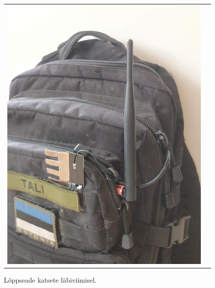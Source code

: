 \documentclass[12pt]{article}
\begin{document}
\begin{figure}[h]
\begin{center}
\begin{tabular}{c c}
\begin{minipage}{0.4\textwidth}
                \includegraphics[width=\textwidth]{figures/fipykotis.jpg}
            \end{minipage}
        \end{tabular}
        \end{center}
        \caption{Lõppseade katsete läbiviimisel.}
        \label{fig:fipykaasas}
    \end{figure}
\end{document}

